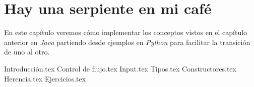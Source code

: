 \chapter{Hay una serpiente en mi café}
  \label{ch:python-java}
  En este capítulo veremos cómo implementar los conceptos vistos en el capítulo anterior 
  en \textit{Java} partiendo desde ejemplos en \textit{Python} para facilitar la 
  transición de uno al otro.

  {Introducción.tex}
  {Control de flujo.tex}
  {Input.tex}
  {Tipos.tex}
  {Constructores.tex}
  {Herencia.tex}
  {Ejercicios.tex}
%